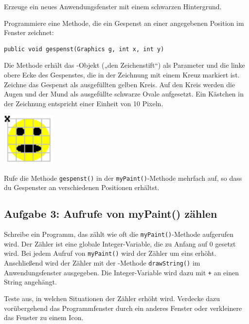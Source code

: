\begin{compactenum}[a)]
\item Erzeuge ein neues Anwendungsfenster mit einem schwarzen Hintergrund.
\item Programmiere eine Methode, die ein Gespenst an einer angegebenen Position
im Fenster zeichnet:
\begin{lstlisting}
public void gespenst(Graphics g, int x, int y)
\end{lstlisting}
Die Methode erhält das -Objekt („den Zeichenstift“) als
Parameter und die linke obere Ecke des Gespenstes, die in der Zeichnung mit
einem Kreuz markiert ist. Zeichne das Gespenst als ausgefüllten gelben Kreis.
Auf den Kreis werden die Augen und der Mund als ausgefüllte schwarze Ovale
aufgesetzt. Ein Kästchen in der Zeichnung entspricht einer Einheit von 10
Pixeln.

\begin{center}
\includegraphics[width=0.2\textwidth]{./inf/SEKII/08_Java_Eigene_Programme_mit_HJFrame/Aufgabe2.png}
\end{center}

\item Rufe die Methode \lstinline|gespenst()| in der
\lstinline|myPaint()|-Methode mehrfach auf, so dass du Gespenster an
verschiedenen Positionen erhältst.
\end{compactenum}


\subsection{Aufgabe 3: Aufrufe von myPaint() zählen}

\begin{compactenum}[a)]
\item Schreibe ein Programm, das zählt wie oft die \lstinline|myPaint()|-Methode
aufgerufen wird. Der Zähler ist eine globale Integer-Variable, die zu Anfang
auf 0 gesetzt wird. Bei jedem Aufruf von \lstinline|myPaint()| wird der Zähler
um eins erhöht. Anschließend wird der Zähler mit der -Methode
\lstinline|drawString()| im Anwendungsfenster ausgegeben. Die Integer-Variable
wird dazu mit \lstinline|+| an einen String angehängt.
\item Teste aus, in welchen Situationen der Zähler erhöht wird. Verdecke dazu
vorübergehend das Programmfenster durch ein anderes Fenster oder verkleinere
das Fenster zu einem Icon.
\end{compactenum}


